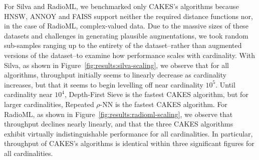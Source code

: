 For Silva and RadioML, we benchmarked only CAKES's algorithms because HNSW, ANNOY and FAISS support neither the required distance functions nor, in the case of RadioML, complex-valued data.
Due to the massive sizes of these datasets and challenges in generating plausible augmentations, we took random sub-samples ranging up to the entirety of the dataset--rather than augmented versions of the dataset--to examine how performance scales with cardinality.
With Silva, as shown in Figure~\ref{fig:results:silva-scaling}, we observe that for all algorithms, throughput initially seems to linearly decrease as cardinality increases, but that it seems to begin levelling off near cardinality $10^5$.
Until cardinality near $10^4$, Depth-First Sieve is the fastest CAKES algorithm, but for larger cardinalities, Repeated $\rho$-NN is the fastest CAKES algorithm.
For RadioML, as shown in Figure~\ref{fig:results:radioml-scaling}, we observe that throughput declines nearly linearly, and that the three CAKES algorithms exhibit virtually indistinguishable performance for all cardinalities.
In particular, throughput of CAKES's algorithms is identical within three significant figures for all cardinalities.

